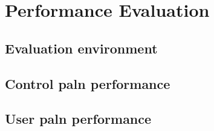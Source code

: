 \chapter{Performance Evaluation}
\label{chapter:evaluation}

\section{Evaluation environment}
\label{sec:evaluation}

\section{Control paln performance}
\label{sec:evaluation}

\section{User paln performance}
\label{sec:evaluation}
